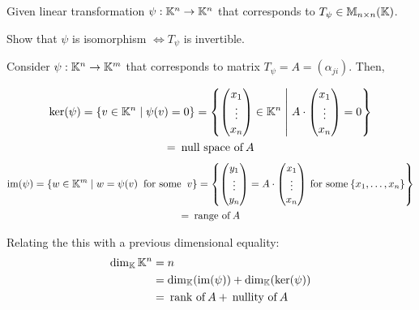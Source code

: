 \begin{exercise}
    Given linear transformation \(\psi: \mathbb{K}^n \to \mathbb{K}^n\) that corresponds to \(T_\psi \in \mathbb{M}_{n \times n}(\mathbb{K})\).

    Show that \(\psi\) is isomorphism \(\Leftrightarrow T_\psi\) is invertible.
\end{exercise}

\begin{remark}
    Consider \(\psi: \mathbb{K}^n \to \mathbb{K}^m\) that corresponds to matrix \(T_\psi = A = (\alpha_{ji})\). Then,

    \begin{multline*}
        \ker(\psi) = \{v \in \mathbb{K}^n \mid \psi(v) = 0\} = \left\{\begin{pmatrix}
                x_1 \\ \vdots \\ x_n
            \end{pmatrix} \in \mathbb{K}^n \;\middle|\; A \cdot \begin{pmatrix}
                x_1 \\ \vdots \\ x_n
            \end{pmatrix} = 0 \right\} \\
        = \:\text{null space of}\:A
    \end{multline*}
    \begin{multline*}
        \mathrm{im}(\psi) = \{w \in \mathbb{K}^m \mid w = \psi(v) \:\text{ for some }\: v\} = \left\{\begin{pmatrix}
                y_1 \\ \vdots \\y_n
            \end{pmatrix} = A \cdot \begin{pmatrix}
                x_1 \\ \vdots \\ x_n
            \end{pmatrix} \:\text{for some}\: \{x_1, \dots, x_n\}\right\} \\
            = \:\text{range of}\: A
    \end{multline*}
\end{remark}

\begin{recall}
    Relating the this with a previous dimensional equality:
    \begin{align*}
        \dim_{\mathbb{K}} \mathbb{K}^n &= n \\
        &= \dim_{\mathbb{K}} (\mathrm{im}(\psi)) + \dim_{\mathbb{K}} (\ker(\psi))\\
        &= \:\text{rank of}\: A + \:\text{nullity of}\: A
    \end{align*}
\end{recall}

